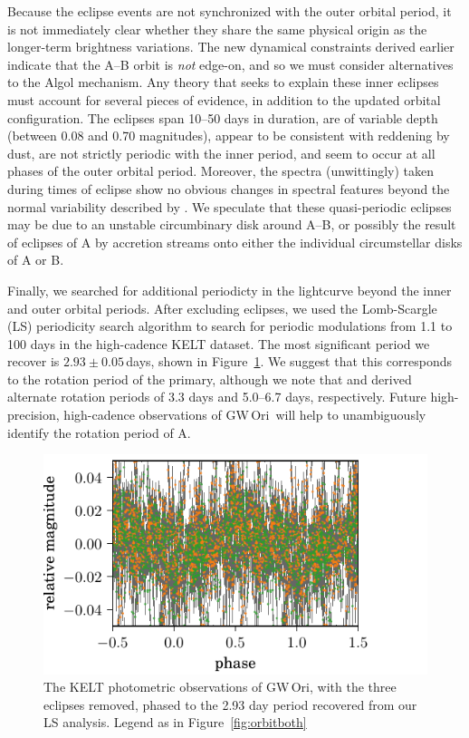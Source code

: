 \documentclass[twocolumn]{aastex61}
\newcommand{\obj}{GW\,Ori}
\begin{document}
Because the eclipse events are not synchronized with the outer orbital period, it is not immediately clear whether they share the same physical origin as the longer-term brightness variations. The new dynamical constraints derived earlier indicate that the A--B orbit is {\it not} edge-on, and so we must consider alternatives to the Algol mechanism. Any theory that seeks to explain these inner eclipses must account for several pieces of evidence, in addition to the updated orbital configuration. The eclipses span 10--50 days in duration, are of variable depth (between 0.08 and 0.70 magnitudes), appear to be consistent with reddening by dust, are not strictly periodic with the inner period, and seem to occur at all phases of the outer orbital period. Moreover, the spectra (unwittingly) taken during times of eclipse show no obvious changes in spectral features beyond the normal variability described by \citet{fang14}. We speculate that these quasi-periodic eclipses may be due to an unstable circumbinary disk around A--B, or possibly the result of eclipses of A by accretion streams onto either the individual circumstellar disks of A or B.

Finally, we searched for additional periodicty in the lightcurve beyond the inner and outer orbital periods. After excluding eclipses, we used the Lomb-Scargle (LS) periodicity search algorithm \citep{lomb76,scargle82}  \citep[within the VARTOOLS analysis package;][]{hartman16} to search for periodic modulations from 1.1 to 100 days in the high-cadence KELT dataset. The most significant period we recover is $2.93 \pm 0.05$\,days, shown in Figure~\ref{fig:phased}. We suggest that this corresponds to the rotation period of the primary, although we note that \citet{bouvier90} and \citet{fang14} derived alternate rotation periods of 3.3 days and 5.0--6.7 days, respectively. Future high-precision, high-cadence observations of \obj\ will help to unambiguously identify the rotation period of A.

\begin{figure}[!ht]
\includegraphics{rotation-phased.pdf}
\caption{The KELT photometric observations of \obj, with the three eclipses removed, phased to the 2.93 day period recovered from our LS analysis. Legend as in Figure~\ref{fig:orbitboth}}
\label{fig:phased}
\end{figure}
\end{document}
